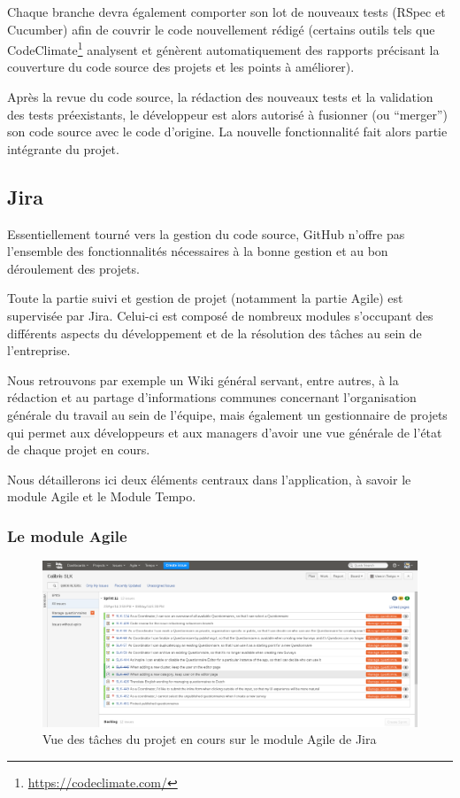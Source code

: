 \documentclass[12pt,a4paper]{book}
\begin{document}
Chaque branche devra également comporter son lot de nouveaux tests (RSpec et Cucumber) afin de couvrir le code nouvellement rédigé (certains outils tels que CodeClimate\footnote{\url{https://codeclimate.com/}} analysent et génèrent automatiquement des rapports précisant la couverture du code source des projets et les points à améliorer).

Après la revue du code source, la rédaction des nouveaux tests et la validation des tests préexistants, le développeur est alors autorisé à fusionner (ou ``merger'') son code source avec le code d'origine. La nouvelle fonctionnalité fait alors partie intégrante du projet.

\subsection{Jira}

\label{sec.jira}

Essentiellement tourné vers la gestion du code source, GitHub n'offre pas l'ensemble des fonctionnalités nécessaires à la bonne gestion et au bon déroulement des projets.

Toute la partie suivi et gestion de projet (notamment la partie Agile) est supervisée par Jira. Celui-ci est composé de nombreux modules s'occupant des différents aspects du développement et de la résolution des tâches au sein de l'entreprise.

Nous retrouvons par exemple un Wiki général servant, entre autres, à la rédaction et au partage d'informations communes concernant l'organisation générale du travail au sein de l'équipe, mais également un gestionnaire de projets qui permet aux développeurs et aux managers d'avoir une vue générale de l'état de chaque projet en cours.

Nous détaillerons ici deux éléments centraux dans l'application, à savoir le module Agile et le Module Tempo.

\subsubsection{Le module Agile}

\begin{figure}[htp]
\centering
\includegraphics[scale=.30]{img/jira_agile_1.png}
 \caption{Vue des tâches du projet en cours sur le module Agile de Jira}
 \label{fig.jira_agile1}
\end{figure}
\end{document}
